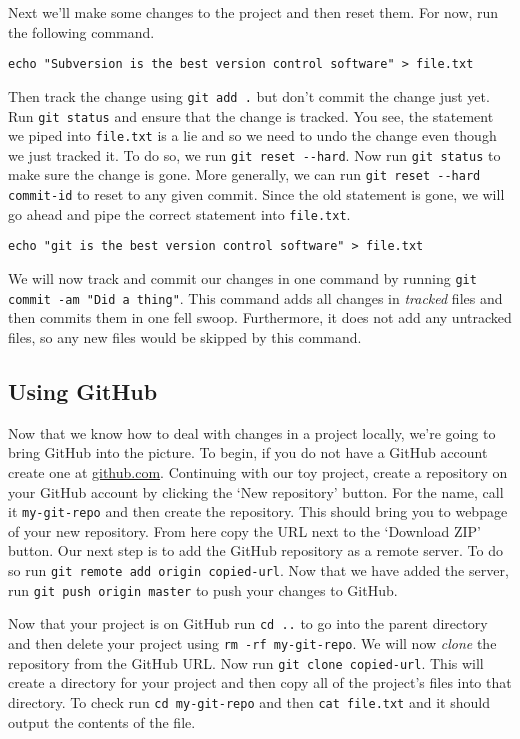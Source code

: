\documentclass[notitlepage]{simple}
\begin{document}
Next we'll make some changes to the project and then reset them.
For now, run the following command.
\begin{center}
	\verb|echo "Subversion is the best version control software" > file.txt|
\end{center}
Then track the change using \verb|git add .| but don't commit the change just yet.
Run \verb|git status| and ensure that the change is tracked.
You see, the statement we piped into \verb|file.txt| is a lie and so we need to undo the change even though we just tracked it.
To do so, we run \verb|git reset --hard|.
Now run \verb|git status| to make sure the change is gone.
More generally, we can run \verb|git reset --hard commit-id| to reset to any given commit.
Since the old statement is gone, we will go ahead and pipe the correct statement into \verb|file.txt|.
\begin{center}
	\verb|echo "git is the best version control software" > file.txt|
\end{center}
We will now track and commit our changes in one command by running \verb|git commit -am "Did a thing"|.
This command adds all changes in \textit{tracked} files and then commits them in one fell swoop.
Furthermore, it does not add any untracked files, so any new files would be skipped by this command.

\subsection{Using GitHub}

Now that we know how to deal with changes in a project locally, we're going to bring GitHub into the picture.
To begin, if you do not have a GitHub account create one at \url{github.com}.
Continuing with our toy project, create a repository on your GitHub account by clicking the `New repository' button.
For the name, call it \verb|my-git-repo| and then create the repository.
This should bring you to webpage of your new repository.
From here copy the URL next to the `Download ZIP' button.
Our next step is to add the GitHub repository as a remote server.
To do so run \verb|git remote add origin copied-url|.
Now that we have added the server, run \verb|git push origin master| to push your changes to GitHub.

Now that your project is on GitHub run \verb|cd ..| to go into the parent directory and then delete your project using \verb|rm -rf my-git-repo|.
We will now \textit{clone} the repository from the GitHub URL.
Now run \verb|git clone copied-url|.
This will create a directory for your project and then copy all of the project's files into that directory.
To check run \verb|cd my-git-repo| and then \verb|cat file.txt| and it should output the contents of the file.
\end{document}
